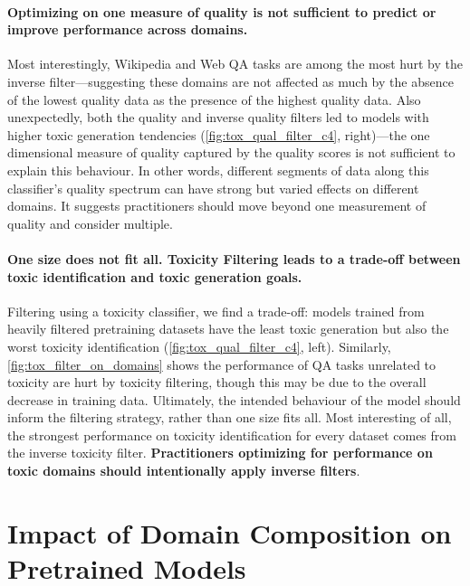 \documentclass{article}
\begin{document}
\vspace{-3mm}
\paragraph{Optimizing on one measure of quality is not sufficient to predict or improve performance across domains.}
Most interestingly, Wikipedia and Web QA tasks are among the most hurt by the inverse filter---suggesting these domains are not affected as much by the absence of the lowest quality data as the presence of the highest quality data.
Also unexpectedly, both the quality and inverse quality filters led to models with higher toxic generation tendencies (\cref{fig:tox_qual_filter_c4}, right)---the one dimensional measure of quality captured by the quality scores is not sufficient to explain this behaviour.
In other words, different segments of data along this classifier's quality spectrum can have strong but varied effects on different domains.
It suggests practitioners should move beyond one measurement of quality and consider multiple.

\vspace{-3mm}
\paragraph{One size does not fit all. Toxicity Filtering leads to a trade-off between toxic identification and toxic generation goals.}
Filtering using a toxicity classifier, we find a trade-off: models trained from heavily filtered pretraining datasets have the least toxic generation but also the worst toxicity identification (\cref{fig:tox_qual_filter_c4}, left).
Similarly, \cref{fig:tox_filter_on_domains} shows the performance of QA tasks unrelated to toxicity are hurt by toxicity filtering, though this may be due to the overall decrease in training data.
Ultimately, the intended behaviour of the model should inform the filtering strategy, rather than one size fits all.
Most interesting of all, the strongest performance on toxicity identification for every dataset comes from the inverse toxicity filter.
\textbf{Practitioners optimizing for performance on toxic domains should intentionally apply inverse filters}.


\vspace{-3mm}
\section{Impact of Domain Composition on Pretrained Models}
\label{sec:domain-comp}
\end{document}
